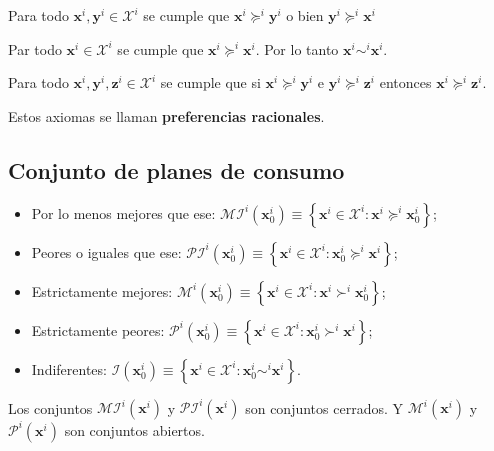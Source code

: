 \begin{axioma}[Completitud]
    Para todo $\textbf{x}^i,\textbf{y}^i\in \mathcal{X}^i$ se cumple que $\textbf{x}^i\succeq^i \textbf{y}^i$ o bien $\textbf{y}^i\succeq^i \textbf{x}^i$
\end{axioma}

\begin{axioma}[Reflexividad]
    Par todo $\textbf{x}^i\in \mathcal{X}^i$ se cumple que $\textbf{x}^i\succeq^i \textbf{x}^i$. Por lo tanto $\textbf{x}^i\sim^i \textbf{x}^i$.
\end{axioma}

\begin{axioma}[Transitividad]
    Para todo $\textbf{x}^i,\textbf{y}^i,\textbf{z}^i\in \mathcal{X}^i$ se cumple que si $\textbf{x}^i\succeq^i \textbf{y}^i$ e $\textbf{y}^i\succeq^i \textbf{z}^i$ entonces $\textbf{x}^i\succeq^i \textbf{z}^i$.
\end{axioma}

Estos axiomas se llaman \textbf{preferencias racionales}.

\subsection{Conjunto de planes de consumo}

\begin{itemize}
    \item Por lo menos mejores que ese: $\mathcal{MI}^i\left(\textbf{x}^i_0\right) \equiv \left\{\textbf{x}^i\in \mathcal{X}^i:\textbf{x}^i\succeq^i \textbf{x}^i_0\right\}$;
    \item Peores o iguales que ese: $\mathcal{PI}^i\left(\textbf{x}^i_0\right) \equiv \left\{\textbf{x}^i\in \mathcal{X}^i:\textbf{x}_0^i\succeq^i \textbf{x}^i\right\}$;
    \item Estrictamente mejores: $\mathcal{M}^i\left(\textbf{x}^i_0\right) \equiv \left\{\textbf{x}^i\in \mathcal{X}^i:\textbf{x}^i\succ^i \textbf{x}^i_0\right\}$;
    \item Estrictamente peores: $\mathcal{P}^i\left(\textbf{x}^i_0\right) \equiv \left\{\textbf{x}^i\in \mathcal{X}^i:\textbf{x}_0^i\succ^i \textbf{x}^i\right\}$;
    \item Indiferentes: $\mathcal{I}\left(\textbf{x}_0^i\right)\equiv \left\{\textbf{x}^i\in \mathcal{X}^i:\textbf{x}_0^i\sim^i \textbf{x}^i\right\}$.
\end{itemize}

Los conjuntos $\mathcal{MI}^i\left(\textbf{x}^i\right)$ y $\mathcal{PI}^i\left(\textbf{x}^i\right)$ son conjuntos cerrados. Y $\mathcal{M}^i\left(\textbf{x}^i\right)$ y $\mathcal{P}^i\left(\textbf{x}^i\right)$ son conjuntos abiertos.

